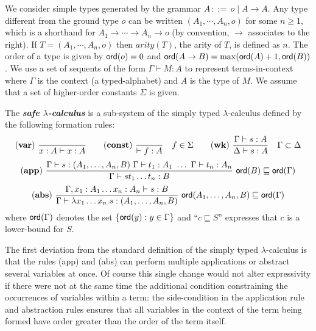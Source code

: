 \documentclass{llncs}
\newcommand\defname[1]{{\bf\em #1}\index{#1}}
\newcommand\dps{\displaystyle}
\newcommand\rulef[2]{\frac{\dps #1}{\dps #2}}
\newcommand\ord[1]{{\sf ord}(#1)}
\newcommand\typear{\rightarrow}
\newcommand{\rulename}[1]{\mathbf{(#1)}}
\begin{document}
We consider simple types generated by the grammar $A
\, ::= \, o \; | \; A \typear A$. Any type different from the ground
type $o$ can be written $(A_1, \cdots, A_n, o)$ for some $n \geq 1$,
which is a shorthand for $A_1 \typear \cdots \typear A_n \typear o$ (by
convention, $\rightarrow$ associates to the right). If $T=(A_1,
\cdots, A_n, o)$ then $arity(T)$, the arity of $T$, is
defined as $n$.
The order of a type is given by $\ord{o} = 0$ and
$\ord{A \typear B} = \max(\ord{A}+1, \ord{B})$.
We use a set of sequents of the form $\Gamma \vdash M : A$ to represent
terms-in-context where $\Gamma$ is the context (a typed-alphabet) and $A$ is the type of $M$. We assume that a set
of higher-order constants $\Sigma$ is given.

\begin{definition}
The \defname{safe $\lambda$-calculus} is a sub-system of the simply typed $\lambda$-calculus
defined by the following formation rules:
$$ \rulename{var} \   \rulef{}{x : A\vdash x : A}
\qquad  \rulename{const} \   \rulef{}{\vdash f : A} \quad f \in \Sigma
\qquad  \rulename{wk} \   \rulef{\Gamma \vdash s : A}{\Delta \vdash s : A} \quad \Gamma \subset \Delta$$
$$ \rulename{app} \  \rulef{\Gamma \vdash s : (A_1,\ldots,A_n,B)
                                        \ \Gamma \vdash t_1 : A_1
                                        \  \ldots\  \Gamma \vdash t_n : A_n }
                                   {\Gamma  \vdash s t_1 \ldots t_n : B}
                                    \
                                   \ord{B} \sqsubseteq \ord{\Gamma}$$
$$ \rulename{abs} \   \rulef{\Gamma, x_1 : A_1 \ldots x_n : A_n \vdash s : B}
                                   {\Gamma  \vdash \lambda x_1 \ldots x_n . s : (A_1, \ldots ,A_n,B)} \
                                   \ord{A_1, \ldots ,A_n,B} \sqsubseteq \ord{\Gamma}$$
where $\ord{\Gamma}$ denotes the set $\{ \ord{y} : y \in \Gamma \}$ and ``$c \sqsubseteq S$'' expresses that
$c$ is a lower-bound for $S$.
\end{definition}

The first deviation from the standard definition of the simply typed $\lambda$-calculus is that the rules {\sf (app)} and {\sf (abs)}
can perform multiple applications or abstract several variables at once.
Of course this single change would not alter expressivity if there were not at the same time the additional condition
constraining the occurrences of variables within a term:  the side-condition in the application rule and abstraction rules ensures that all variables in the context of the term being formed have order greater than the order of the term itself.
\end{document}
